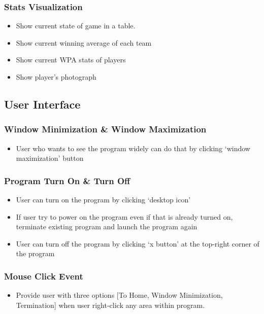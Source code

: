 \documentclass[conference,compsoc, twocolumn]{IEEEtran}
\begin{document}
\subsubsection{Stats Visualization}
\begin{itemize}
\item Show current state of game in a table.
\item Show current winning average of each team 
\item Show current WPA stats of players
\item Show player's photograph
\end{itemize}

\subsection{User Interface}


\subsubsection{Window Minimization \& Window Maximization}
\begin{itemize}
\item User who wants to see the program widely can do that by clicking ‘window maximization’ button
\end{itemize}

\subsubsection{Program Turn On \& Turn Off}
\begin{itemize}
\item User can turn on the program by clicking ‘desktop icon’ 
\item If user try to power on the program even if that is already turned on, terminate existing program and launch the program again
\item User can turn off the program by clicking ‘x button’ at the top-right corner of the program
\end{itemize}

\subsubsection{Mouse Click Event}
\begin{itemize}
\item Provide user with three options [To Home, Window Minimization, Termination] when user right-click any area within program.
\end{itemize}
\end{document}
